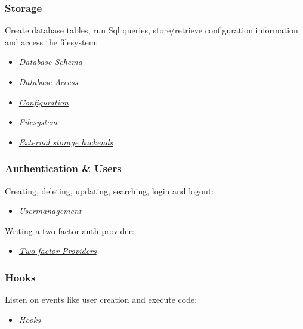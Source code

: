 \documentclass[letterpaper,10pt,english]{sphinxmanual}
\begin{document}
\subsubsection{Storage}
\label{app/index:storage}
Create database tables, run Sql queries, store/retrieve configuration information and access the filesystem:
\begin{itemize}
\item {} 
{\hyperref[app/schema::doc]{\emph{\emph{Database Schema}}}}

\item {} 
{\hyperref[app/database::doc]{\emph{\emph{Database Access}}}}

\item {} 
{\hyperref[app/configuration::doc]{\emph{\emph{Configuration}}}}

\item {} 
{\hyperref[app/filesystem::doc]{\emph{\emph{Filesystem}}}}

\item {} 
{\hyperref[app/extstorage::doc]{\emph{\emph{External storage backends}}}}

\end{itemize}


\subsubsection{Authentication \& Users}
\label{app/index:authentication-users}
Creating, deleting, updating, searching, login and logout:
\begin{itemize}
\item {} 
{\hyperref[app/users::doc]{\emph{\emph{Usermanagement}}}}

\end{itemize}

Writing a two-factor auth provider:
\begin{itemize}
\item {} 
{\hyperref[app/two\string-factor\string-provider::doc]{\emph{\emph{Two-factor Providers}}}}

\end{itemize}


\subsubsection{Hooks}
\label{app/index:hooks}
Listen on events like user creation and execute code:
\begin{itemize}
\item {} 
{\hyperref[app/hooks::doc]{\emph{\emph{Hooks}}}}

\end{itemize}
\end{document}
